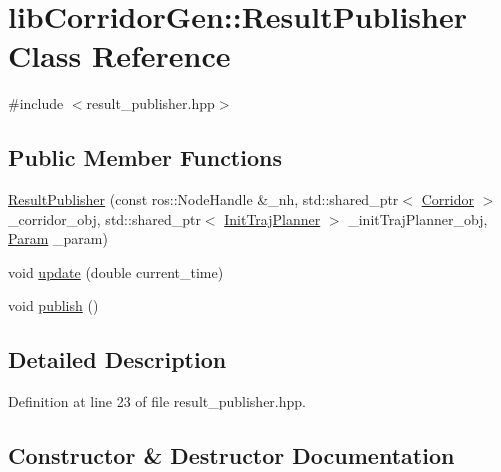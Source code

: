 \hypertarget{classlib_corridor_gen_1_1_result_publisher}{}\section{lib\+Corridor\+Gen\+:\+:Result\+Publisher Class Reference}
\label{classlib_corridor_gen_1_1_result_publisher}


{\ttfamily \#include $<$result\+\_\+publisher.\+hpp$>$}

\subsection*{Public Member Functions}
\begin{DoxyCompactItemize}
\item 
\hyperlink{classlib_corridor_gen_1_1_result_publisher_a45476376dd8eb2a32c2357f7fb2e23b4}{Result\+Publisher} (const ros\+::\+Node\+Handle \&\+\_\+nh, std\+::shared\+\_\+ptr$<$ \hyperlink{classlib_corridor_gen_1_1_corridor}{Corridor} $>$ \+\_\+corridor\+\_\+obj, std\+::shared\+\_\+ptr$<$ \hyperlink{classlib_corridor_gen_1_1_init_traj_planner}{Init\+Traj\+Planner} $>$ \+\_\+init\+Traj\+Planner\+\_\+obj, \hyperlink{classlib_corridor_gen_1_1_param}{Param} \+\_\+param)
\item 
void \hyperlink{classlib_corridor_gen_1_1_result_publisher_ac44b00acc1fbb46fb1b0ba1473b32145}{update} (double current\+\_\+time)
\item 
void \hyperlink{classlib_corridor_gen_1_1_result_publisher_a846ddb44d304b996236505af060c760d}{publish} ()
\end{DoxyCompactItemize}


\subsection{Detailed Description}


Definition at line 23 of file result\+\_\+publisher.\+hpp.



\subsection{Constructor \& Destructor Documentation}
\mbox{\label{classlib_corridor_gen_1_1_result_publisher_a45476376dd8eb2a32c2357f7fb2e23b4}} 

